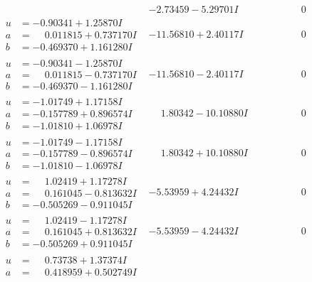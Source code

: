 \documentclass[1p]{elsarticle_modified}
\theoremstyle{definition}
\begin{document}
$$\begin{array}{c|c|c}
 & -2.73459 - 5.29701 I & \phantom{-0.000000 } 0 \\ \hline\begin{aligned}
u &= -0.90341 + 1.25870 I \\
a &= \phantom{-}0.011815 + 0.737170 I \\
b &= -0.469370 + 1.161280 I\end{aligned}
 & -11.56810 + 2.40117 I & \phantom{-0.000000 } 0 \\ \hline\begin{aligned}
u &= -0.90341 - 1.25870 I \\
a &= \phantom{-}0.011815 - 0.737170 I \\
b &= -0.469370 - 1.161280 I\end{aligned}
 & -11.56810 - 2.40117 I & \phantom{-0.000000 } 0 \\ \hline\begin{aligned}
u &= -1.01749 + 1.17158 I \\
a &= -0.157789 + 0.896574 I \\
b &= -1.01810 + 1.06978 I\end{aligned}
 & \phantom{-}1.80342 - 10.10880 I & \phantom{-0.000000 } 0 \\ \hline\begin{aligned}
u &= -1.01749 - 1.17158 I \\
a &= -0.157789 - 0.896574 I \\
b &= -1.01810 - 1.06978 I\end{aligned}
 & \phantom{-}1.80342 + 10.10880 I & \phantom{-0.000000 } 0 \\ \hline\begin{aligned}
u &= \phantom{-}1.02419 + 1.17278 I \\
a &= \phantom{-}0.161045 - 0.813632 I \\
b &= -0.505269 - 0.911045 I\end{aligned}
 & -5.53959 + 4.24432 I & \phantom{-0.000000 } 0 \\ \hline\begin{aligned}
u &= \phantom{-}1.02419 - 1.17278 I \\
a &= \phantom{-}0.161045 + 0.813632 I \\
b &= -0.505269 + 0.911045 I\end{aligned}
 & -5.53959 - 4.24432 I & \phantom{-0.000000 } 0 \\ \hline\begin{aligned}
u &= \phantom{-}0.73738 + 1.37374 I \\
a &= \phantom{-}0.418959 + 0.502749 I \\

\end{aligned}
\end{array}$$
\end{document}
